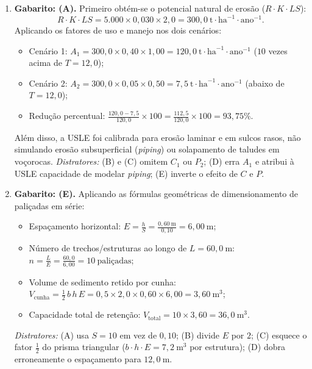 \begin{boxGabarito}
\begin{enumerate}[leftmargin=1.8em, itemsep=5pt]
  \item \textbf{Gabarito: (A).} Primeiro obtém-se o potencial natural de erosão ($R \cdot K \cdot LS$):
  \[
    R \cdot K \cdot LS = 5.000 \times 0,030 \times 2,0 = 300,0\ \text{t}\cdot\text{ha}^{-1}\cdot\text{ano}^{-1}.
  \]
  Aplicando os fatores de uso e manejo nos dois cenários:
  \begin{itemize}[leftmargin=1.4em, itemsep=1pt, topsep=2pt]
    \item Cenário 1: $A_1 = 300,0 \times 0,40 \times 1,00 = 120,0\ \text{t}\cdot\text{ha}^{-1}\cdot\text{ano}^{-1}$ ($10$ vezes acima de $T = 12,0$);
    \item Cenário 2: $A_2 = 300,0 \times 0,05 \times 0,50 = 7,5\ \text{t}\cdot\text{ha}^{-1}\cdot\text{ano}^{-1}$ (abaixo de $T = 12,0$);
    \item Redução percentual: $\frac{120,0 - 7,5}{120,0} \times 100 = \frac{112,5}{120,0}\times 100 = 93,75\%$.
  \end{itemize}
  Além disso, a USLE foi calibrada para erosão laminar e em sulcos rasos, não simulando erosão subsuperficial (\textit{piping}) ou solapamento de taludes em voçorocas. \textit{Distratores:} (B) e (C) omitem $C_1$ ou $P_2$; (D) erra $A_1$ e atribui à USLE capacidade de modelar \textit{piping}; (E) inverte o efeito de $C$ e $P$.

  \item \textbf{Gabarito: (E).} Aplicando as fórmulas geométricas de dimensionamento de paliçadas em série:
  \begin{itemize}[leftmargin=1.4em, itemsep=1pt, topsep=2pt]
    \item Espaçamento horizontal: $E = \frac{h}{S} = \frac{0,60\ \text{m}}{0,10} = 6,00\ \text{m}$;
    \item Número de trechos/estruturas ao longo de $L = 60,0\ \text{m}$: $n = \frac{L}{E} = \frac{60,0}{6,00} = 10\ \text{paliçadas}$;
    \item Volume de sedimento retido por cunha: $V_{\text{cunha}} = \tfrac{1}{2}\,b\,h\,E = 0,5 \times 2,0 \times 0,60 \times 6,00 = 3,60\ \text{m}^3$;
    \item Capacidade total de retenção: $V_{\text{total}} = 10 \times 3,60 = 36,0\ \text{m}^3$.
  \end{itemize}
  \textit{Distratores:} (A) usa $S = 10$ em vez de $0,10$; (B) divide $E$ por $2$; (C) esquece o fator $\tfrac{1}{2}$ do prisma triangular ($b \cdot h \cdot E = 7,2\ \text{m}^3$ por estrutura); (D) dobra erroneamente o espaçamento para $12,0\ \text{m}$.


\end{enumerate}
\end{boxGabarito}
